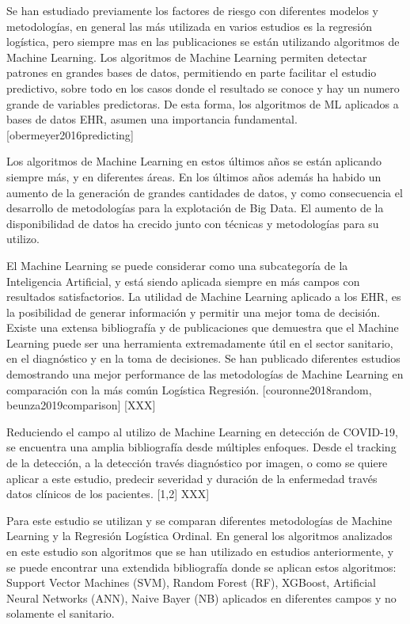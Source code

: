 \documentclass[
]{article}
\begin{document}
Se han estudiado previamente los factores de riesgo con diferentes
modelos y metodologías, en general las más utilizada en varios estudios
es la regresión logística, pero siempre mas en las publicaciones se
están utilizando algoritmos de Machine Learning. Los algoritmos de
Machine Learning permiten detectar patrones en grandes bases de datos,
permitiendo en parte facilitar el estudio predictivo, sobre todo en los
casos donde el resultado se conoce y hay un numero grande de variables
predictoras. De esta forma, los algoritmos de ML aplicados a bases de
datos EHR, asumen una importancia fundamental.
{[}obermeyer2016predicting{]}

Los algoritmos de Machine Learning en estos últimos años se están
aplicando siempre más, y en diferentes áreas. En los últimos años además
ha habido un aumento de la generación de grandes cantidades de datos, y
como consecuencia el desarrollo de metodologías para la explotación de
Big Data. El aumento de la disponibilidad de datos ha crecido junto con
técnicas y metodologías para su utilizo.

El Machine Learning se puede considerar como una subcategoría de la
Inteligencia Artificial, y está siendo aplicada siempre en más campos
con resultados satisfactorios. La utilidad de Machine Learning aplicado
a los EHR, es la posibilidad de generar información y permitir una mejor
toma de decisión. Existe una extensa bibliografía y de publicaciones que
demuestra que el Machine Learning puede ser una herramienta
extremadamente útil en el sector sanitario, en el diagnóstico y en la
toma de decisiones. Se han publicado diferentes estudios demostrando una
mejor performance de las metodologías de Machine Learning en comparación
con la más común Logística Regresión. {[}couronne2018random,
beunza2019comparison{]} {[}XXX{]}

Reduciendo el campo al utilizo de Machine Learning en detección de
COVID-19, se encuentra una amplia bibliografía desde múltiples enfoques.
Desde el tracking de la detección, a la detección través diagnóstico por
imagen, o como se quiere aplicar a este estudio, predecir severidad y
duración de la enfermedad través datos clínicos de los pacientes.
{[}1,2{]} XXX{]}

Para este estudio se utilizan y se comparan diferentes metodologías de
Machine Learning y la Regresión Logística Ordinal. En general los
algoritmos analizados en este estudio son algoritmos que se han
utilizado en estudios anteriormente, y se puede encontrar una extendida
bibliografía donde se aplican estos algoritmos: Support Vector Machines
(SVM), Random Forest (RF), XGBoost, Artificial Neural Networks (ANN),
Naive Bayer (NB) aplicados en diferentes campos y no solamente el
sanitario.
\end{document}
